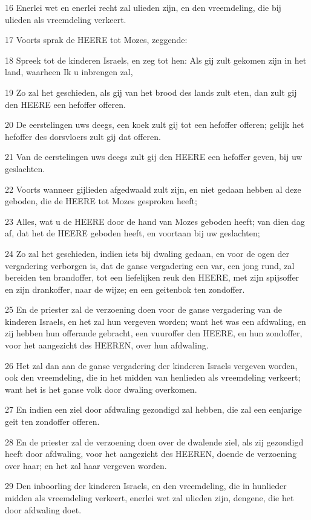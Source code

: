 \par 16 Enerlei wet en enerlei recht zal ulieden zijn, en den vreemdeling, die bij ulieden als vreemdeling verkeert.
\par 17 Voorts sprak de HEERE tot Mozes, zeggende:
\par 18 Spreek tot de kinderen Israels, en zeg tot hen: Als gij zult gekomen zijn in het land, waarheen Ik u inbrengen zal,
\par 19 Zo zal het geschieden, als gij van het brood des lands zult eten, dan zult gij den HEERE een hefoffer offeren.
\par 20 De eerstelingen uws deegs, een koek zult gij tot een hefoffer offeren; gelijk het hefoffer des dorsvloers zult gij dat offeren.
\par 21 Van de eerstelingen uws deegs zult gij den HEERE een hefoffer geven, bij uw geslachten.
\par 22 Voorts wanneer gijlieden afgedwaald zult zijn, en niet gedaan hebben al deze geboden, die de HEERE tot Mozes gesproken heeft;
\par 23 Alles, wat u de HEERE door de hand van Mozes geboden heeft; van dien dag af, dat het de HEERE geboden heeft, en voortaan bij uw geslachten;
\par 24 Zo zal het geschieden, indien iets bij dwaling gedaan, en voor de ogen der vergadering verborgen is, dat de ganse vergadering een var, een jong rund, zal bereiden ten brandoffer, tot een liefelijken reuk den HEERE, met zijn spijsoffer en zijn drankoffer, naar de wijze; en een geitenbok ten zondoffer.
\par 25 En de priester zal de verzoening doen voor de ganse vergadering van de kinderen Israels, en het zal hun vergeven worden; want het was een afdwaling, en zij hebben hun offerande gebracht, een vuuroffer den HEERE, en hun zondoffer, voor het aangezicht des HEEREN, over hun afdwaling.
\par 26 Het zal dan aan de ganse vergadering der kinderen Israels vergeven worden, ook den vreemdeling, die in het midden van henlieden als vreemdeling verkeert; want het is het ganse volk door dwaling overkomen.
\par 27 En indien een ziel door afdwaling gezondigd zal hebben, die zal een eenjarige geit ten zondoffer offeren.
\par 28 En de priester zal de verzoening doen over de dwalende ziel, als zij gezondigd heeft door afdwaling, voor het aangezicht des HEEREN, doende de verzoening over haar; en het zal haar vergeven worden.
\par 29 Den inboorling der kinderen Israels, en den vreemdeling, die in hunlieder midden als vreemdeling verkeert, enerlei wet zal ulieden zijn, dengene, die het door afdwaling doet.
